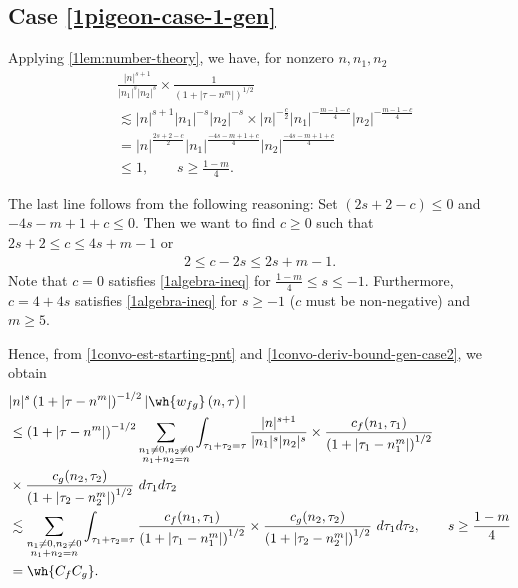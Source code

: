 \subsection{Case \eqref{1pigeon-case-1-gen}}
Applying \cref{1lem:number-theory}, we have, for nonzero $ n, n_1, n_2 $
%
\begin{equation}
	\label{1convo-deriv-bound-gen-case2}
	\begin{split}
		& \frac{|n|^{s+1}}{|n_1|^s 
		| n_2|^s}
		\times
		\frac{1}{(1 + | \tau -n^m |)^{1/2}}
		\\
		& \lesssim | n |^{s+1}| n_1 |^{-s}| n_2 |^{-s} \times | n
		|^{-\frac{c}{2}}| n_1 |^{-\frac{m-1-c}{4}}| n_2 |^{-\frac{m-1-c}{4}} 
		\\
		& = | n |^{\frac{2s+2 -c}{2}} | n_1 |^{\frac{-4s -m + 1+ c}{4}} | n_2
		|^\frac{-4s -m + 1+ c}{4}
		\\
		& \le 1, \qquad s \ge \frac{1-m}{4}.
	\end{split}  
\end{equation}
%
%
\begin{framed}
\begin{remark}
	\label{1rem:gen-s-val}
	 The last line follows from the following reasoning: Set $(2s + 2 -c) \le
0$ and $-4s -m +1 +c \le 0$. Then we want to find $c \ge 0$ such that $2s +2 \le c \le
4s + m-1$ or 
%
%
\begin{equation}
	\label{1algebra-ineq}
	\begin{split}
		2 \le c - 2s \le 2s + m-1.
	\end{split}
\end{equation}
%
%
Note that $c=0$ satisfies \eqref{1algebra-ineq} for $\frac{1-m}{4} \le s \le
-1$. Furthermore, $c = 4 + 4s$ satisfies \eqref{1algebra-ineq} for $s \ge -1$ ($c$ must be non-negative) and $m \ge 5$. 
\end{remark}
\end{framed}
%
Hence, from \eqref{1convo-est-starting-pnt} and
\eqref{1convo-deriv-bound-gen-case2},
we obtain 
\begin{equation}
	\label{1convo-est-starting-pnt-gen-case2}
	\begin{split}
		 & |n|^s \left( 1 + | \tau - n^m | \right)^{-1/2} | \wh{w_{fg}}\left( 
		n, \tau \right) |
		\\
		& \le \left( 1 + | \tau - n^m | \right)^{-1/2}
		\sum_{\substack{n_1 \neq0, n_2 \neq 0 \\n_1 + n_2 =n}} \int_{\tau_1 + \tau_2 = \tau}\frac{|n|^{s+1}}{|n_1|^s | n_2|^s} 
		\times \frac{c_f(n_1, \tau_1)}{\left( 1 + | \tau_1 - n_1^m | 
		\right)^{1/2}}
		\\
		& \times
		\frac{c_g(n_2, \tau_2)}{\left( 1 + | \tau_2 - n_2^m | 
		\right)^{1/2}}\ d \tau_1 d \tau_2
		\\
		& \lesssim \sum_{\substack{n_1 \neq0, n_2 \neq 0 \\n_1 + n_2 =n}} \int_{\tau_1 + \tau_2 = \tau}\frac{c_f(n_1, \tau_1)}{\left( 1 + | \tau_1 - n_1^m | 
		\right)^{1/2}} \times
		\frac{c_g(n_2, \tau_2)}{\left( 1 + | \tau_2 - n_2^m | 
		\right)^{1/2}}\ d \tau_1 d \tau_2, \qquad s \ge \frac{1-m}{4}
		\\
		& = \wh{{C_f} C_g}.
	\end{split}
\end{equation}
